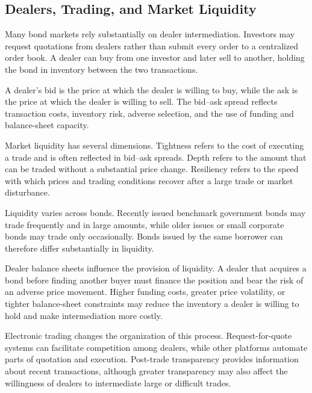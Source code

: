 \subsection{Dealers, Trading, and Market Liquidity}

Many bond markets rely substantially on dealer intermediation. Investors may request quotations from dealers rather than submit every order to a centralized order book. A dealer can buy from one investor and later sell to another, holding the bond in inventory between the two transactions.

A dealer's bid is the price at which the dealer is willing to buy, while the ask is the price at which the dealer is willing to sell. The bid--ask spread reflects transaction costs, inventory risk, adverse selection, and the use of funding and balance-sheet capacity.

Market liquidity has several dimensions. Tightness refers to the cost of executing a trade and is often reflected in bid--ask spreads. Depth refers to the amount that can be traded without a substantial price change. Resiliency refers to the speed with which prices and trading conditions recover after a large trade or market disturbance.

Liquidity varies across bonds. Recently issued benchmark government bonds may trade frequently and in large amounts, while older issues or small corporate bonds may trade only occasionally. Bonds issued by the same borrower can therefore differ substantially in liquidity.

Dealer balance sheets influence the provision of liquidity. A dealer that acquires a bond before finding another buyer must finance the position and bear the risk of an adverse price movement. Higher funding costs, greater price volatility, or tighter balance-sheet constraints may reduce the inventory a dealer is willing to hold and make intermediation more costly.

Electronic trading changes the organization of this process. Request-for-quote systems can facilitate competition among dealers, while other platforms automate parts of quotation and execution. Post-trade transparency provides information about recent transactions, although greater transparency may also affect the willingness of dealers to intermediate large or difficult trades.

